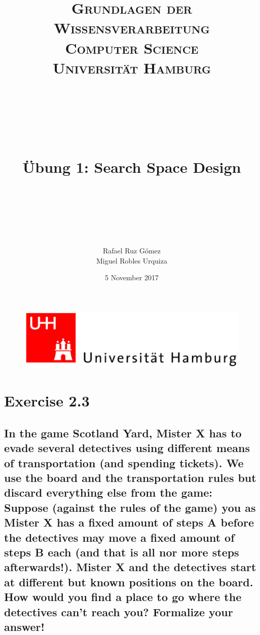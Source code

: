 \documentclass[paper=a4, fontsize=11pt]{scrartcl} %
\title{	
\normalfont \normalsize 
\textsc{\textbf{Grundlagen der Wissensverarbeitung} \\ Computer Science \\ Universität Hamburg} \\ [25pt] %
~\\
~\\
~\\
\horrule{0.5pt} \\[0.4cm] %
\Huge Übung 1: Search Space Design \\ %
\horrule{2pt} \\[0.5cm] %
~\\
~\\
}
\author{Rafael Ruz Gómez\\Miguel Robles Urquiza} %
\date{\normalsize 5 November 2017} %
\numberwithin{equation}{section} %
\numberwithin{figure}{section} %
\numberwithin{table}{section} %
\begin{document}
\maketitle %

\begin{figure}
	\centering
	\includegraphics[scale=0.8]{logo_uni_hamburg.png}
\end{figure}

\newpage %





\section{Exercise 2.3}

\subsection{In the game Scotland Yard, Mister X has to evade several detectives using different means of transportation (and spending tickets). We use the board and the transportation rules but discard everything else from the game: Suppose (against the rules of the game) you as Mister X has a fixed amount of steps A before the detectives may move a fixed amount of steps B each (and that is all nor more steps afterwards!). Mister X and the detectives start at different but known positions on the board. How would you find a place to go where the detectives can't reach you? Formalize your answer!}
\end{document}
